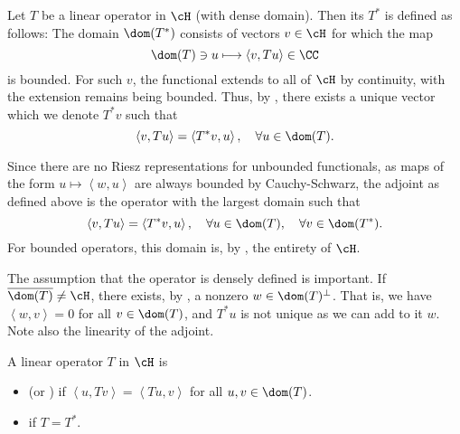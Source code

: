 \documentclass[oneside,reqno,letterpaper]{amsart}
\begin{document}
\begin{definition}
  Let \(T\) be a linear operator in \(\cH\) (with dense domain).
  Then its  \(T^*\) is defined as follows: 
  The domain \(\dom(T^*)\) consists of vectors \(v \in \cH\) for which the map 
  \[
    \dom(T) \ni u \longmapsto  \left< v, T u \right> \in \CC
  \] 
  is bounded. 
  For such \(v\), the functional extends to all of \(\cH\) by continuity, with the extension remains being bounded. 
  Thus, by , there exists a unique vector which we denote \(T^* v\) such that 
  \[
    \left< v, Tu \right> = \left< T^* v, u \right>, \quad \forall u \in \dom(T) . 
  \] 
\end{definition}

Since there are no Riesz representations for unbounded functionals, as maps of the form \(u \mapsto \left< w, u \right>\) are always bounded by Cauchy-Schwarz, the adjoint as defined above is the operator with the largest domain such that   
\[
  \left< v, T u \right> = \left< T^* v, u \right>, \quad \forall u \in \dom(T), \quad \forall v \in \dom(T^*). 
\]
For bounded operators, this domain is, by , the entirety of \(\cH\). 


The assumption that the operator is densely defined is important. 
If \(\overline{\dom(T)} \neq \cH\), there exists, by , a nonzero \(w \in \dom(T)^\perp\).
That is, we have \(\left< w, v \right> = 0\) for all \(v \in \dom(T)\), and \(T^* u\) is not unique as we can add to it \(w\). 
Note also the linearity of the adjoint.






\begin{definition}
  A linear operator \(T\) in \(\cH\) is 
  \begin{itemize}
    \item {} (or ) if \(\left< u, Tv \right> = \left< Tu, v \right>\) for all \(u, v \in \dom(T)\). 
  \item {} if \(T = T^*\). 
  \end{itemize}
\end{definition}
\end{document}
